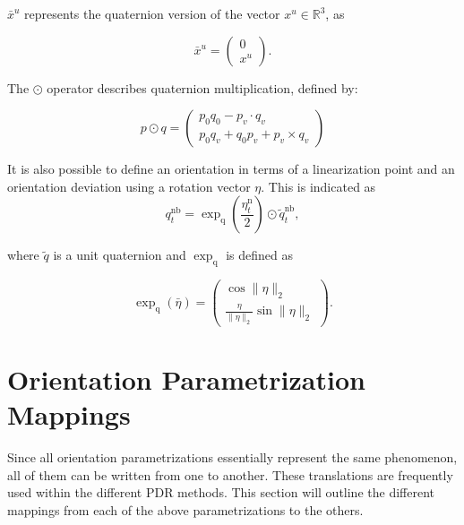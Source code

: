 $\bar{x}^u$ represents the quaternion version of the vector $x^u \in \mathbb{R}^3$, as

\begin{equation}
	\label{eq:app_quat_vec_ref}
	\bar{x}^u=\left(\begin{array}{l}{0} \\ {x^u}\end{array}\right).
\end{equation}


The $\odot$ operator describes quaternion multiplication, defined by:

\begin{equation}
	\label{eq:app_quat_multiplication}
	p \odot q=\left(\begin{array}{c}{p_{0} q_{0}-p_{v} \cdot q_{v}} \\ {p_{0} q_{v}+q_{0} p_{v}+p_{v} \times q_{v}}\end{array}\right)
\end{equation}

It is also possible to define an orientation in terms of a linearization point and an orientation deviation using a rotation vector $\eta$. This is indicated as 
\begin{equation}
	q_{t}^{\mathrm{nb}} = \exp _{\mathrm{q}}\left(\frac{\eta_{t}^{\mathrm{n}}}{2}\right) \odot \tilde{q}_{t}^{\mathrm{nb}} \label{eq:quat_linear},
\end{equation}

where $\tilde{q}$ is a unit quaternion and $\exp_\mathrm{q}$ \cite{Kok2017} is defined as

\begin{equation}
	\exp_\mathrm{q} (\bar{\eta}) = \left(\begin{array}{c}{\cos \|\eta\|_{2}} \\ {\frac{\eta}{\|\eta\|_{2}} \sin \|\eta\|_{2}}\end{array}\right) \label{eq:exp_q}.
\end{equation}



\section{Orientation Parametrization Mappings}
Since all orientation parametrizations essentially represent the same phenomenon, all of them can be written from one to another. These translations are frequently used within the different \ac{PDR} methods. This section will outline the different mappings from each of the above parametrizations to the others.

